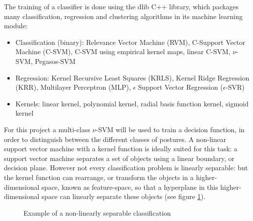 The training of a classifier is done using the dlib C++ library, which packages many classification, regression and clustering algorithms in its machine learning module:
\begin{itemize}
\item Classification (binary): Relevance Vector Machine (RVM), C-Support Vector Machine (C-SVM), C-SVM using empirical kernel maps, linear C-SVM, $\nu$-SVM, Pegasos-SVM
\item Regression: Kernel Recursive Least Squares (KRLS), Kernel Ridge Regression (KRR), Multilayer Perceptron (MLP), $\epsilon$ Support Vector Regression ($\epsilon$-SVR)
\item Kernels: linear kernel, polynomial kernel, radial basis function kernel, sigmoid kernel
\end{itemize}

For this project a multi-class $\nu$-SVM will be used to train a decision function, in order to distinguish between the different classes of postures. A non-linear support vector machine with a kernel function  is ideally suited for this task: a support vector machine separates a set of objects using a linear boundary, or decision plane. However not every classification problem is linearly separable: but the kernel function can rearrange, or transform the objects in a higher-dimensional space, known as feature-space, so that a hyperplane in this higher-dimensional space can linearly separate these objects \cite{svmbook} (see figure \ref{fig:svm-boundary}).

\begin{figure}[H]
	\centering
	\hspace{0.03\textwidth}
	\caption{Example of a non-linearly separable classification \cite{svmbook}}
	\label{fig:svm-boundary}
\end{figure}

